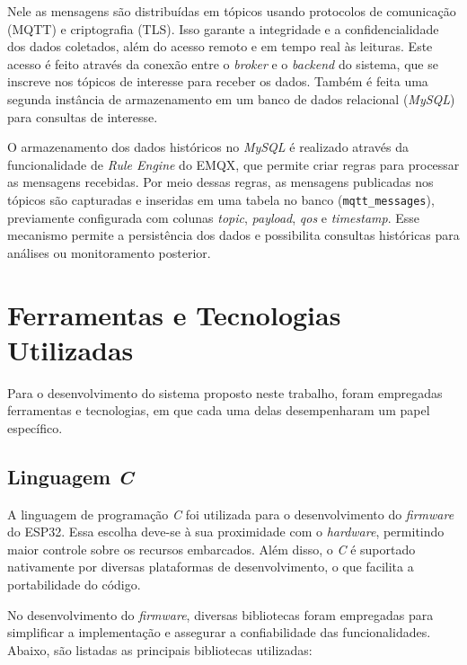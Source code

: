 Nele as mensagens são distribuídas em tópicos usando protocolos de comunicação (MQTT) e criptografia (TLS). Isso garante a integridade e a confidencialidade dos dados coletados, além do acesso remoto e em tempo real às leituras. Este acesso é feito através da conexão entre o \textit{broker} e o \textit{backend} do sistema, que se inscreve nos tópicos de interesse para receber os dados. Também é feita uma segunda instância de armazenamento em um banco de dados relacional (\textit{MySQL}) para consultas de interesse. 

O armazenamento dos dados históricos no \textit{MySQL} é realizado através da funcionalidade de \textit{Rule Engine} do EMQX, que permite criar regras para processar as mensagens recebidas. Por meio dessas regras, as mensagens publicadas nos tópicos são capturadas e inseridas em uma tabela no banco (\texttt{mqtt\_messages}), previamente configurada com colunas \textit{topic}, \textit{payload}, \textit{qos} e \textit{timestamp}. Esse mecanismo permite a persistência dos dados e possibilita consultas históricas para análises ou monitoramento posterior.

\section{Ferramentas e Tecnologias Utilizadas}

Para o desenvolvimento do sistema proposto neste trabalho, foram empregadas ferramentas e tecnologias, em que cada uma delas desempenharam um papel específico.

\subsection{Linguagem \textit{C}}
A linguagem de programação \textit{C} foi utilizada para o desenvolvimento do \textit{firmware} do ESP32. Essa escolha deve-se à sua proximidade com o \textit{hardware}, permitindo maior controle sobre os recursos embarcados. Além disso, o \textit{C} é suportado nativamente por diversas plataformas de desenvolvimento, o que facilita a portabilidade do código.

No desenvolvimento do \textit{firmware}, diversas bibliotecas foram empregadas para simplificar a implementação e assegurar a confiabilidade das funcionalidades. Abaixo, são listadas as principais bibliotecas utilizadas:

